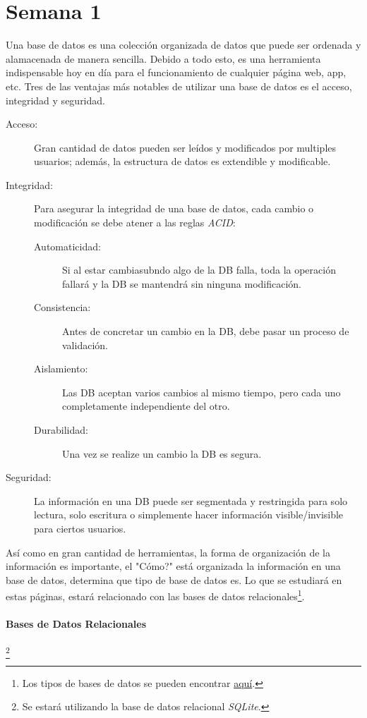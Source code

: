 \section{Semana 1}

Una base de datos es una colección organizada de datos que puede ser ordenada y alamacenada de manera sencilla. Debido a todo esto, es una herramienta indispensable hoy en día para el funcionamiento de cualquier página web, app, etc. Tres de las ventajas más notables de utilizar una base de datos es el acceso, integridad y seguridad.

\begin{description}
	\item[Acceso: ] Gran cantidad de datos pueden ser leídos y modificados por multiples usuarios; además, la estructura de datos es extendible y modificable.
	\item[Integridad: ] Para asegurar la integridad de una base de datos, cada cambio o modificación se debe atener a las reglas \textit{ACID}:
	\begin{description}
		\item[Automaticidad: ] Si al estar cambiasubndo algo de la DB falla, toda la operación fallará y la DB se mantendrá sin ninguna modificación.
		\item[Consistencia: ] Antes de concretar un cambio en la DB, debe pasar un proceso de validación.
		\item[Aislamiento: ] Las DB aceptan varios cambios al mismo tiempo, pero cada uno completamente independiente del otro.
		\item[Durabilidad: ] Una vez se realize un cambio la DB es segura.
	\end{description}
	\item[Seguridad: ] La información en una DB puede ser segmentada y restringida para solo lectura, solo escritura o simplemente hacer información visible/invisible para ciertos usuarios.
\end{description}

Así como en gran cantidad de herramientas, la forma de organización de la información es importante, el "Cómo?" está organizada la información en una base de datos, determina que tipo de base de datos es. Lo que se estudiará en estas páginas, estará relacionado con las bases de datos relacionales\footnote{Los tipos de bases de datos se pueden encontrar \href{https://www.tutorialspoint.com/Types-of-databases}{aquí}.}.

\paragraph{Bases de Datos Relacionales}\footnote{Se estará utilizando la base de datos relacional \textit{SQLite}.}

